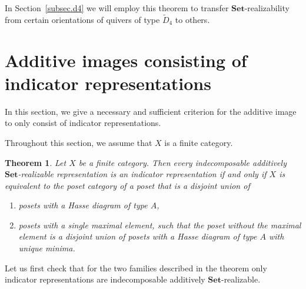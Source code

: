 \documentclass[a4paper]{amsart}
\theoremstyle{plain}
\newtheorem{theorem}{Theorem}[section]
\theoremstyle{definition}
\theoremstyle{remark}
\newcommand{\Set}{\mathbf{Set}}
\begin{document}
In Section~\ref{subsec.d4} we will employ this theorem to transfer \( \Set \)-realizability from certain orientations of quivers of type \( \tilde{D}_4 \) to others.

\section{Additive images consisting of indicator representations}
\label{subsect:only_thin}

In this section, we give a necessary and sufficient criterion for the additive image to only consist of indicator representations.

Throughout this section, we assume that $X$ is a finite category.

\begin{theorem}
\label{thm.onlythin}
Let \( X \) be a finite category. Then every indecomposable additively \( \Set \)-realizable representation is an indicator representation if and only if \( X \) is equivalent to the poset category of a poset that is a disjoint union of
\begin{enumerate}
\item posets with a Hasse diagram of type \( A \),
\item posets with a single maximal element, such that the poset without the maximal element is a disjoint union of posets with a Hasse diagram of type \( A \) with unique minima.
\end{enumerate}
\end{theorem}

Let us first check that for the two families described in the theorem only indicator representations are indecomposable additively \( \Set \)-realizable.
\end{document}
